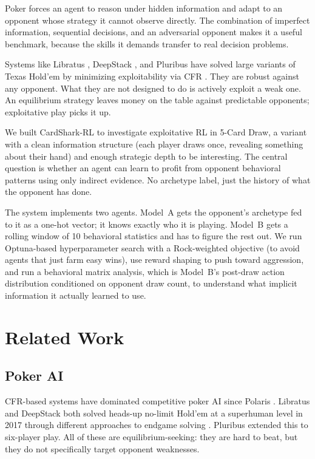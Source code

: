 \documentclass[11pt, conference]{IEEEtran}
\begin{document}
Poker forces an agent to reason under hidden information and adapt to an
opponent whose strategy it cannot observe directly. The combination of
imperfect information, sequential decisions, and an adversarial opponent
makes it a useful benchmark, because the skills it demands transfer to real decision problems.

Systems like Libratus \cite{brown2018libratus}, DeepStack
\cite{moravcik2017deepstack}, and Pluribus \cite{brown2019superhuman}
have solved large variants of Texas Hold'em by minimizing exploitability
via CFR \cite{zinkevich2007regret}. They are robust against any opponent.
What they are not designed to do is actively exploit a weak one. An
equilibrium strategy leaves money on the table against predictable
opponents; exploitative play picks it up.

We built CardShark-RL to investigate exploitative RL in 5-Card Draw,
a variant with a clean information structure (each player draws once,
revealing something about their hand) and enough strategic depth to be
interesting. The central question is whether an agent can learn to profit
from opponent behavioral patterns using only indirect evidence. No
archetype label, just the history of what the opponent has done.

The system implements two agents. Model~A gets the opponent's archetype
fed to it as a one-hot vector; it knows exactly who it is playing.
Model~B gets a rolling window of 10 behavioral statistics and has to
figure the rest out. We run Optuna-based hyperparameter search with a
Rock-weighted objective (to avoid agents that just farm easy wins),
use reward shaping to push toward aggression, and run a behavioral
matrix analysis, which is Model~B's post-draw action
distribution conditioned on opponent draw count, to understand what
implicit information it actually learned to use.

\section{Related Work}
\label{sec:related}

\subsection{Poker AI}

CFR-based systems have dominated competitive poker AI since Polaris
\cite{zinkevich2007regret}. Libratus \cite{brown2018libratus} and
DeepStack \cite{moravcik2017deepstack} both solved heads-up no-limit
Hold'em at a superhuman level in 2017 through different approaches
to endgame solving \cite{ganzfried2015endgame}. Pluribus
\cite{brown2019superhuman} extended this to six-player play. All of
these are equilibrium-seeking: they are hard to beat, but they do not
specifically target opponent weaknesses.
\end{document}
